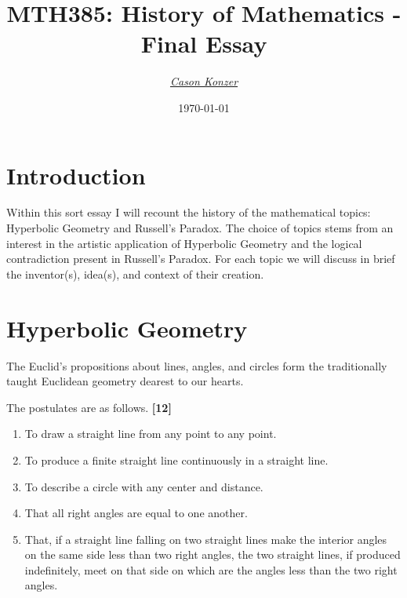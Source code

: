 \documentclass[12pt]{article}
\newcommand{\XB}{\color{black}}
\newcommand{\XV}{\color{violet}}
\begin{document}
\title{\textbf{MTH385}: History of Mathematics - Final Essay}
\date{\today}
\author{\XV\textit{\large{\href{https://github.com/casonk}{Cason Konzer}}}\XB}

\maketitle

\hrulefill

\newpage

\section{Introduction}

\hspace{5mm}
Within this sort essay I will recount the history of the mathematical topics: 
Hyperbolic Geometry and Russell's Paradox.
The choice of topics stems from an interest in the artistic application of 
Hyperbolic Geometry and the logical contradiction present in Russell's Paradox. 
For each topic we will discuss in brief the inventor(s), idea(s), and context of their creation. 

\section{Hyperbolic Geometry}

\hspace{5mm}
The Euclid's propositions about lines, angles, and circles form the traditionally taught 
Euclidean geometry dearest to our hearts.

The postulates are as follows. \textbf{[12]} 

\begin{enumerate}
  \item To draw a straight line from any point to any point.
  \item To produce a finite straight line continuously in a straight line.
  \item To describe a circle with any center and distance.
  \item That all right angles are equal to one another.
  \item That, if a straight line falling on two straight lines make the interior angles
  on the same side less than two right angles, the two straight lines, if produced
  indefinitely, meet on that side on which are the angles less than the
  two right angles.
\end{enumerate}
\end{document}
